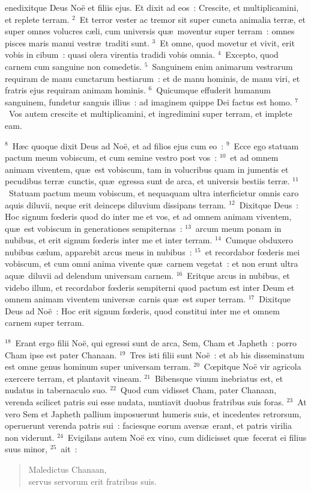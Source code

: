 \bchapter
{}enedixitque Deus No\"e et filiis ejus. Et dixit ad eos~: Crescite, et multiplicamini, et replete terram.
${}^{2}$~Et terror vester ac tremor sit super cuncta animalia terr\ae , et super omnes volucres c\ae li, cum universis qu\ae\ moventur super terram~: omnes pisces maris manui vestr\ae\ traditi sunt.
${}^{3}$~Et omne, quod movetur et vivit, erit vobis in cibum~: quasi olera virentia tradidi vobis omnia.
${}^{4}$~Excepto, quod carnem cum sanguine non comedetis.
${}^{5}$~Sanguinem enim animarum vestrarum requiram de manu cunctarum bestiarum~: et de manu hominis, de manu viri, et fratris ejus requiram animam hominis.
${}^{6}$~Quicumque effuderit humanum sanguinem, fundetur sanguis illius~: ad imaginem quippe Dei factus est homo.
${}^{7}$~Vos autem crescite et multiplicamini, et ingredimini super terram, et implete eam.


${}^{8}$~H\ae c quoque dixit Deus ad No\"e, et ad filios ejus cum eo~:
${}^{9}$~Ecce ego statuam pactum meum vobiscum, et cum semine vestro post vos~:
${}^{10}$~et ad omnem animam viventem, qu\ae\ est vobiscum, tam in volucribus quam in jumentis et pecudibus terr\ae\ cunctis, qu\ae\ egressa sunt de arca, et universis bestiis terr\ae .
${}^{11}$~Statuam pactum meum vobiscum, et nequaquam ultra interficietur omnis caro aquis diluvii, neque erit deinceps diluvium dissipans terram.
${}^{12}$~Dixitque Deus~: Hoc signum fœderis quod do inter me et vos, et ad omnem animam viventem, qu\ae\ est vobiscum in generationes sempiternas~:
${}^{13}$~arcum meum ponam in nubibus, et erit signum fœderis inter me et inter terram.
${}^{14}$~Cumque obduxero nubibus c\ae lum, apparebit arcus meus in nubibus~:
${}^{15}$~et recordabor fœderis mei vobiscum, et cum omni anima vivente qu\ae\ carnem vegetat~: et non erunt ultra aqu\ae\ diluvii ad delendum universam carnem.
${}^{16}$~Eritque arcus in nubibus, et videbo illum, et recordabor fœderis sempiterni quod pactum est inter Deum et omnem animam viventem univers\ae\ carnis qu\ae\ est super terram.
${}^{17}$~Dixitque Deus ad No\"e~: Hoc erit signum fœderis, quod constitui inter me et omnem carnem super terram.


${}^{18}$~Erant ergo filii No\"e, qui egressi sunt de arca, Sem, Cham et Japheth~: porro Cham ipse est pater Chanaan.
${}^{19}$~Tres isti filii sunt No\"e~: et ab his disseminatum est omne genus hominum super universam terram.
${}^{20}$~Cœpitque No\"e vir agricola exercere terram, et plantavit vineam.
${}^{21}$~Bibensque vinum inebriatus est, et nudatus in tabernaculo suo.
${}^{22}$~Quod cum vidisset Cham, pater Chanaan, verenda scilicet patris sui esse nudata, nuntiavit duobus fratribus suis foras.
${}^{23}$~At vero Sem et Japheth pallium imposuerunt humeris suis, et incedentes retrorsum, operuerunt verenda patris sui~: faciesque eorum avers\ae\ erant, et patris virilia non viderunt.
${}^{24}$~Evigilans autem No\"e ex vino, cum didicisset qu\ae\ fecerat ei filius suus minor,
${}^{25}$~ait~: \begin{flushleft}\begin{verse}Maledictus Chanaan,\\ servus servorum erit fratribus suis.\end{verse}\end{flushleft}



